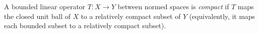 
A bounded linear operator $T:X\to Y$ between normed spaces is \emph{compact} if $T$ maps the closed unit ball of $X$ to a relatively compact subset of $Y$ (equivalently, it maps each bounded subset to a relatively compact subset).
